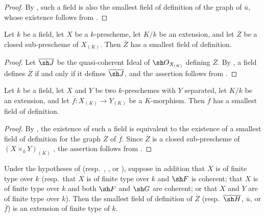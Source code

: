 \begin{proof}
By , such a field is also the smallest field of
definition of the graph of $\overline u$, whose existence follows
from .
\end{proof}


\begin{corollary}[4.8.11]
\label{IV.4.8.11}
Let $k$ be a field, let $X$ be a $k$-prescheme, let $K/k$ be an
extension, and let $\overline Z$ be a closed sub-prescheme of
$X_{(K)}$.
Then $\overline Z$ has a smallest field of definition.
\end{corollary}

\begin{proof}
Let $\overline{\sh J}$ be the quasi-coherent Ideal of
$\sh O_{X_{(K)}}$ defining $\overline Z$.
By , a field defines $\overline Z$ if and only if
it defines $\overline{\sh J}$, and the assertion follows from
.
\end{proof}

\begin{corollary}[4.8.12]
\label{IV.4.8.12}
Let $k$ be a field, let $X$ and $Y$ be two $k$-preschemes with $Y$
separated, let $K/k$ be an extension, and let
$\overline f:X_{(K)}\to Y_{(K)}$ be a $K$-morphism.
Then $\overline f$ has a smallest field of definition.
\end{corollary}

\begin{proof}
By , the existence of such a field is equivalent
to the existence of a smallest field of definition for the graph
$\overline Z$ of $\overline f$.
Since $\overline Z$ is a closed sub-prescheme of
$(X\times_kY)_{(K)}$ , the assertion follows from
.
\end{proof}

\begin{proposition}[4.8.13]
\label{IV.4.8.13}
Under the hypotheses of 
(resp.\ , , or
), suppose in addition that $X$ is of finite type
over $k$
(resp.\ that $X$ is of finite type over $k$ and $\sh F$ is coherent;
that $X$ is of finite type over $k$ and both $\sh F$ and $\sh G$ are
coherent; or that $X$ and $Y$ are of finite type over $k$).
Then the smallest field of definition of $\overline Z$
(resp.\ $\overline{\sh H}$, $\overline u$, or $\overline f$) is an extension of
finite type of $k$.
\end{proposition}

